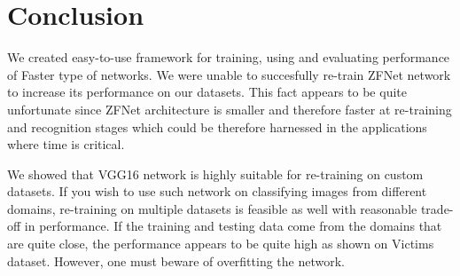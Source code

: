 \chapter{Conclusion}

We created easy-to-use framework for training, using and evaluating performance of Faster \rcnn type of networks. We were unable to succesfully re-train ZFNet network to increase its performance on our datasets. This fact appears to be quite unfortunate since ZFNet architecture is smaller and therefore faster at re-training and recognition stages which could be therefore harnessed in the applications where time is critical.

We showed that VGG16 network is highly suitable for re-training on custom datasets. If you wish to use such network on classifying images from different domains, re-training on multiple datasets is feasible as well with reasonable trade-off in performance. If the training and testing data come from the domains that are quite close, the performance appears to be quite high as shown on Victims dataset. However, one must beware of overfitting the network.
